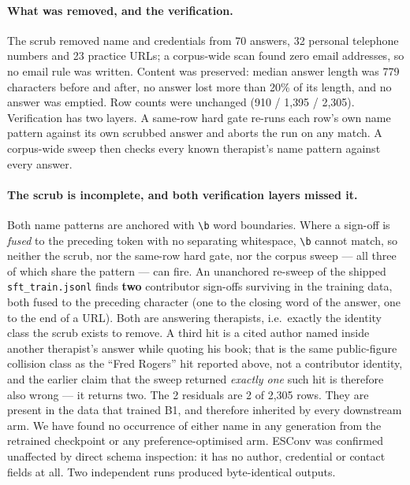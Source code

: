 \paragraph{What was removed, and the verification.} The scrub removed name and
credentials from 70 answers, 32 personal telephone numbers and 23 practice URLs; a
corpus-wide scan found zero email addresses, so no email rule was written. Content was
preserved: median answer length was 779 characters before and after, no answer lost more
than 20\% of its length, and no answer was emptied. Row counts were unchanged
(910 / 1{,}395 / 2{,}305). Verification has two layers. A same-row hard gate re-runs each
row's own name pattern against its own scrubbed answer and aborts the run on any match. A
corpus-wide sweep then checks every known therapist's name pattern against every answer.

\paragraph{The scrub is incomplete, and both verification layers missed it.}
Both name patterns are anchored with \verb|\b| word boundaries. Where a sign-off is
\emph{fused} to the preceding token with no separating whitespace, \verb|\b| cannot match,
so neither the scrub, nor the same-row hard gate, nor the corpus sweep --- all three of
which share the pattern --- can fire. An unanchored re-sweep of the shipped
\texttt{sft\_train.jsonl} finds \textbf{two} contributor sign-offs surviving in the
training data, both fused to the preceding character (one to the closing word of the
answer, one to the end of a URL). Both are answering therapists, i.e.\ exactly the
identity class the scrub exists to remove. A third hit is a cited author named inside
another therapist's answer while quoting his book; that is the same public-figure
collision class as the ``Fred Rogers'' hit reported above, not a contributor identity, and
the earlier claim that the sweep returned \emph{exactly one} such hit is therefore also
wrong --- it returns two. The 2 residuals are 2 of 2{,}305 rows. They are present in the
data that trained B1, and therefore inherited by every downstream arm. We have found no
occurrence of either name in any generation from the retrained checkpoint or any
preference-optimised arm. ESConv was
confirmed unaffected by direct schema inspection: it has no author, credential or
contact fields at all. Two independent runs produced byte-identical outputs.


